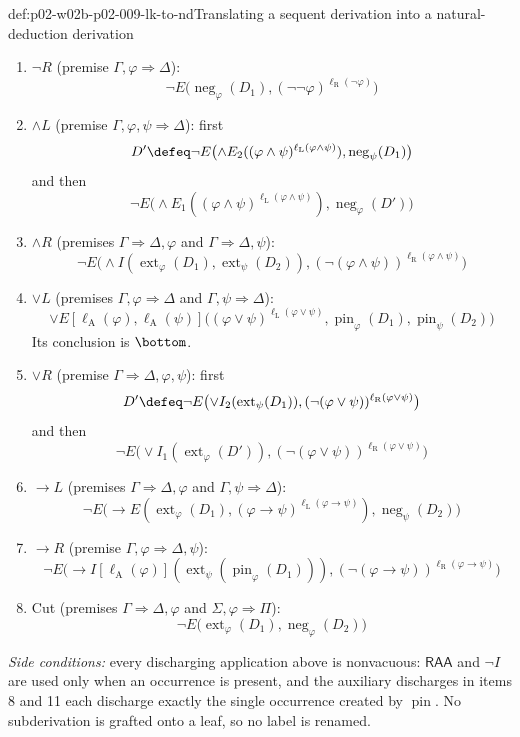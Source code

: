 \begin{hbmethod}{def:p02-w02b-p02-009-lk-to-nd}{Translating a sequent derivation into a natural-deduction derivation}
\begin{enumerate}
    \[\neg E\bigl(\operatorname{ext}_\varphi(D_1),
    (\neg\varphi)^{\ell_{\mathrm L}(\neg\varphi)}\bigr)\]
  \item \(\neg R\) (premise \(\Gamma,\varphi\Rightarrow\Delta\)):
    \[\neg E\bigl(\operatorname{neg}_\varphi(D_1),
    (\neg\neg\varphi)^{\ell_{\mathrm R}(\neg\varphi)}\bigr)\]
  \item \(\land L\) (premise \(\Gamma,\varphi,\psi\Rightarrow\Delta\)): first
    \[D'\defeq\neg E\bigl(\land E_2((\varphi\land\psi)^{\ell_{\mathrm L}(\varphi\land\psi)}),
    \operatorname{neg}_\psi(D_1)\bigr)\]
    and then
    \[\neg E\bigl(\land E_1((\varphi\land\psi)^{\ell_{\mathrm L}(\varphi\land\psi)}),
    \operatorname{neg}_\varphi(D')\bigr)\]
  \item \(\land R\) (premises \(\Gamma\Rightarrow\Delta,\varphi\) and
    \(\Gamma\Rightarrow\Delta,\psi\)):
    \[\neg E\bigl(\land I(\operatorname{ext}_\varphi(D_1),\operatorname{ext}_\psi(D_2)),
    (\neg(\varphi\land\psi))^{\ell_{\mathrm R}(\varphi\land\psi)}\bigr)\]
  \item \(\lor L\) (premises \(\Gamma,\varphi\Rightarrow\Delta\) and
    \(\Gamma,\psi\Rightarrow\Delta\)):
    \[\lor E[\ell_{\mathrm A}(\varphi),\ell_{\mathrm A}(\psi)]\bigl(
    (\varphi\lor\psi)^{\ell_{\mathrm L}(\varphi\lor\psi)},
    \operatorname{pin}_\varphi(D_1),\operatorname{pin}_\psi(D_2)\bigr)\]
    Its conclusion is \(\bottom\).
  \item \(\lor R\) (premise \(\Gamma\Rightarrow\Delta,\varphi,\psi\)): first
    \[D'\defeq\neg E\bigl(\lor I_2(\operatorname{ext}_\psi(D_1)),
    (\neg(\varphi\lor\psi))^{\ell_{\mathrm R}(\varphi\lor\psi)}\bigr)\]
    and then
    \[\neg E\bigl(\lor I_1(\operatorname{ext}_\varphi(D')),
    (\neg(\varphi\lor\psi))^{\ell_{\mathrm R}(\varphi\lor\psi)}\bigr)\]
  \item \(\to L\) (premises \(\Gamma\Rightarrow\Delta,\varphi\) and
    \(\Gamma,\psi\Rightarrow\Delta\)):
    \[\neg E\bigl(\to E(\operatorname{ext}_\varphi(D_1),
    (\varphi\to\psi)^{\ell_{\mathrm L}(\varphi\to\psi)}),
    \operatorname{neg}_\psi(D_2)\bigr)\]
  \item \(\to R\) (premise \(\Gamma,\varphi\Rightarrow\Delta,\psi\)):
    \[\neg E\bigl(\to I[\ell_{\mathrm A}(\varphi)](
    \operatorname{ext}_\psi(\operatorname{pin}_\varphi(D_1))),
    (\neg(\varphi\to\psi))^{\ell_{\mathrm R}(\varphi\to\psi)}\bigr)\]
  \item Cut (premises \(\Gamma\Rightarrow\Delta,\varphi\) and
    \(\Sigma,\varphi\Rightarrow\Pi\)):
    \[\neg E\bigl(\operatorname{ext}_\varphi(D_1),
    \operatorname{neg}_\varphi(D_2)\bigr)\]
\end{enumerate}
\emph{Side conditions:} every discharging application above is nonvacuous:
\(\mathsf{RAA}\) and \(\neg I\) are used only when an occurrence is present,
and the auxiliary discharges in items 8 and 11 each discharge exactly the
single occurrence created by \(\operatorname{pin}\).  No subderivation is
grafted onto a leaf, so no label is renamed.
\end{hbmethod}

